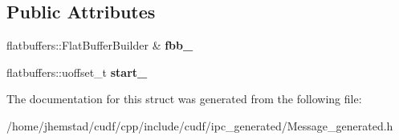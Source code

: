 \subsection*{Public Attributes}
\begin{DoxyCompactItemize}
\item 
flatbuffers\+::\+Flat\+Buffer\+Builder \& {\bfseries fbb\+\_\+}\hypertarget{structorg_1_1apache_1_1arrow_1_1flatbuf_1_1RecordBatchBuilder_aa384e77c3ed5044e676920cfbe12d3d8}{}\label{structorg_1_1apache_1_1arrow_1_1flatbuf_1_1RecordBatchBuilder_aa384e77c3ed5044e676920cfbe12d3d8}

\item 
flatbuffers\+::uoffset\+\_\+t {\bfseries start\+\_\+}\hypertarget{structorg_1_1apache_1_1arrow_1_1flatbuf_1_1RecordBatchBuilder_afceddfda89ab693cf9182264e1cb950c}{}\label{structorg_1_1apache_1_1arrow_1_1flatbuf_1_1RecordBatchBuilder_afceddfda89ab693cf9182264e1cb950c}

\end{DoxyCompactItemize}


The documentation for this struct was generated from the following file\+:\begin{DoxyCompactItemize}
\item 
/home/jhemstad/cudf/cpp/include/cudf/ipc\+\_\+generated/Message\+\_\+generated.\+h\end{DoxyCompactItemize}
